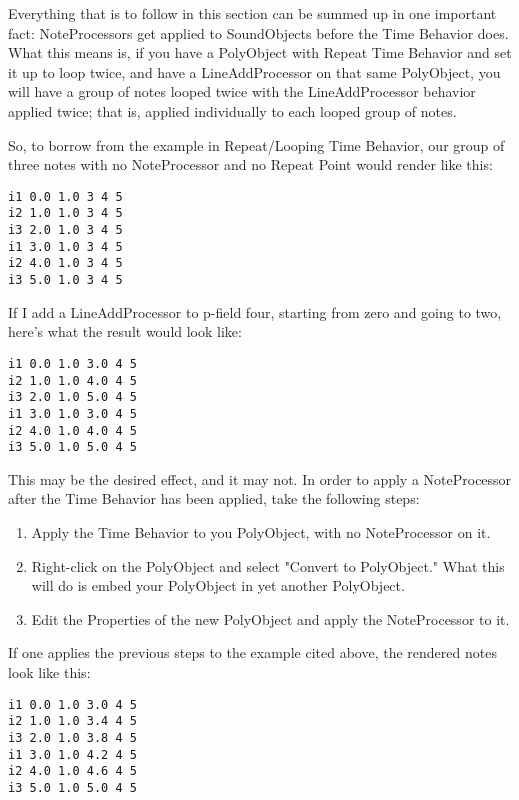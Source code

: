 Everything that is to follow in this section can be summed up in one
important fact: NoteProcessors get applied to SoundObjects before the
Time Behavior does. What this means is, if you have a PolyObject with
Repeat Time Behavior and set it up to loop twice, and have a
LineAddProcessor on that same PolyObject, you will have a group of notes
looped twice with the LineAddProcessor behavior applied twice; that is,
applied individually to each looped group of notes.

So, to borrow from the example in Repeat/Looping Time Behavior, our
group of three notes with no NoteProcessor and no Repeat Point would
render like this:

\begin{verbatim}
i1 0.0 1.0 3 4 5
i2 1.0 1.0 3 4 5
i3 2.0 1.0 3 4 5
i1 3.0 1.0 3 4 5
i2 4.0 1.0 3 4 5
i3 5.0 1.0 3 4 5
\end{verbatim}

If I add a LineAddProcessor to p-field four, starting from zero and
going to two, here's what the result would look like:

\begin{verbatim}
i1 0.0 1.0 3.0 4 5
i2 1.0 1.0 4.0 4 5
i3 2.0 1.0 5.0 4 5
i1 3.0 1.0 3.0 4 5
i2 4.0 1.0 4.0 4 5
i3 5.0 1.0 5.0 4 5
\end{verbatim}

This may be the desired effect, and it may not. In order to apply a
NoteProcessor after the Time Behavior has been applied, take the
following steps:

\begin{enumerate}
\def\labelenumi{\arabic{enumi}.}
\item
  Apply the Time Behavior to you PolyObject, with no NoteProcessor on
  it.
\item
  Right-click on the PolyObject and select "Convert to PolyObject." What
  this will do is embed your PolyObject in yet another PolyObject.
\item
  Edit the Properties of the new PolyObject and apply the NoteProcessor
  to it.
\end{enumerate}

If one applies the previous steps to the example cited above, the
rendered notes look like this:

\begin{verbatim}
i1 0.0 1.0 3.0 4 5
i2 1.0 1.0 3.4 4 5
i3 2.0 1.0 3.8 4 5
i1 3.0 1.0 4.2 4 5
i2 4.0 1.0 4.6 4 5
i3 5.0 1.0 5.0 4 5
\end{verbatim}


